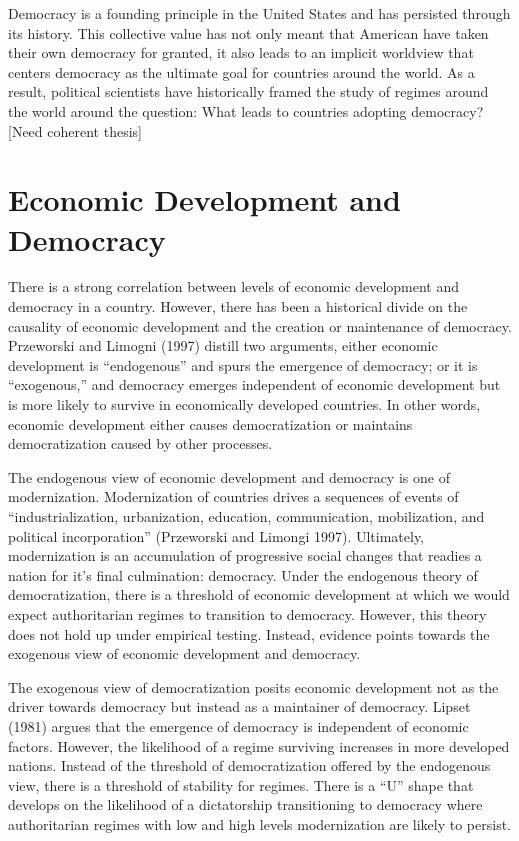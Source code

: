 \documentclass[12pt,]{article}
\begin{document}
Democracy is a founding principle in the United States and has persisted
through its history. This collective value has not only meant that
American have taken their own democracy for granted, it also leads to an
implicit worldview that centers democracy as the ultimate goal for
countries around the world. As a result, political scientists have
historically framed the study of regimes around the world around the
question: What leads to countries adopting democracy? {[}Need coherent
thesis{]}

\hypertarget{economic-development-and-democracy}{%
\section{Economic Development and
Democracy}\label{economic-development-and-democracy}}

There is a strong correlation between levels of economic development and
democracy in a country. However, there has been a historical divide on
the causality of economic development and the creation or maintenance of
democracy. Przeworski and Limogni (1997) distill two arguments, either
economic development is ``endogenous'' and spurs the emergence of
democracy; or it is ``exogenous,'' and democracy emerges independent of
economic development but is more likely to survive in economically
developed countries. In other words, economic development either causes
democratization or maintains democratization caused by other processes.

The endogenous view of economic development and democracy is one of
modernization. Modernization of countries drives a sequences of events
of ``industrialization, urbanization, education, communication,
mobilization, and political incorporation'' (Przeworski and Limongi
1997). Ultimately, modernization is an accumulation of progressive
social changes that readies a nation for it's final culmination:
democracy. Under the endogenous theory of democratization, there is a
threshold of economic development at which we would expect authoritarian
regimes to transition to democracy. However, this theory does not hold
up under empirical testing. Instead, evidence points towards the
exogenous view of economic development and democracy.

The exogenous view of democratization posits economic development not as
the driver towards democracy but instead as a maintainer of democracy.
Lipset (1981) argues that the emergence of democracy is independent of
economic factors. However, the likelihood of a regime surviving
increases in more developed nations. Instead of the threshold of
democratization offered by the endogenous view, there is a threshold of
stability for regimes. There is a ``U'' shape that develops on the
likelihood of a dictatorship transitioning to democracy where
authoritarian regimes with low and high levels modernization are likely
to persist.
\end{document}
